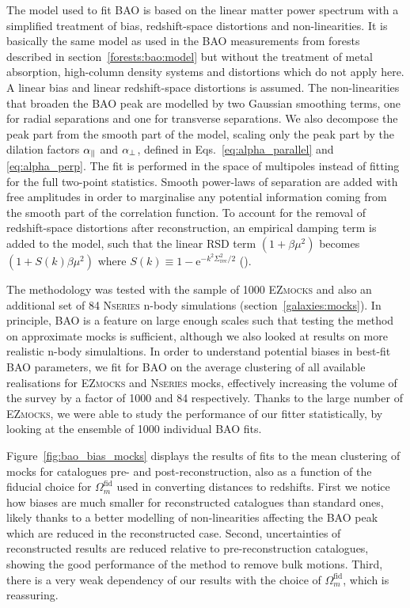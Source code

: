 The model used to fit BAO is based on the linear matter power spectrum with a simplified
treatment of bias, redshift-space distortions and non-linearities. 
It is basically the same model as used in the BAO measurements from 
\lya forests described in section~\ref{forests:bao:model} but without 
the treatment of metal absorption, high-column density systems and 
distortions which do not apply here. 
A linear bias and linear redshift-space distortions is assumed. 
The non-linearities that broaden the BAO peak are modelled by two 
Gaussian smoothing terms, one for radial separations and one for transverse separations. 
We also decompose the peak part from the smooth part of the model, 
scaling only the peak part by the dilation factors ${\alpha_\parallel}$ and ${\alpha_\perp}$, 
defined in Eqs.~\ref{eq:alpha_parallel} and \ref{eq:alpha_perp}.
The fit is performed in the space of multipoles instead of fitting for the 
full two-point statistics. Smooth power-laws of separation are added with free amplitudes 
in order to marginalise any potential information coming from 
the smooth part of the correlation function. 
To account for the removal of redshift-space distortions after reconstruction, 
an empirical damping term is added to the model, such that the linear RSD term 
$(1+\beta \mu^2)$ becomes $(1+ S(k) \beta \mu^2)$ where 
$S(k)\equiv 1- \text{e}^{-k^2\Sigma^2_\text{rec}/2}$ 
(\cite{seoModelingReconstructedBAO2016}). 

The methodology was tested with the sample of 1000 \textsc{EZmocks} 
and also an additional set of 84 \textsc{Nseries} n-body simulations 
(section~\ref{galaxies:mocks}). 
In principle, BAO is a feature on large enough scales 
such that testing the method on approximate mocks is sufficient, 
although we also looked at results on more realistic n-body simulaltions. 
In order to understand potential biases in best-fit BAO parameters, 
we fit for BAO on the average clustering of all available realisations 
for \textsc{EZmocks} and \textsc{Nseries} mocks,
effectively increasing the volume of the survey by a factor of 1000 and 84
respectively. Thanks to the large number of \textsc{EZmocks}, we 
were able to study the performance of our fitter statistically, 
by looking at the ensemble of 1000 individual BAO fits. 

Figure~\ref{fig:bao_bias_mocks} displays the results of fits 
to the mean clustering of mocks for 
catalogues pre- and post-reconstruction, also as a function of the 
fiducial choice for $\Omega_m^\text{fid}$ used in converting distances to redshifts. 
First we notice how biases are much smaller for reconstructed catalogues 
than standard ones, likely thanks to a better modelling of non-linearities 
affecting the BAO peak which are reduced in the reconstructed case. 
Second, uncertainties of reconstructed results 
are reduced relative to pre-reconstruction catalogues, 
showing the good performance of the method to remove 
bulk motions. 
Third, there is a very weak dependency of our results with the choice of
$\Omega_m^\text{fid}$, which is reassuring. 

